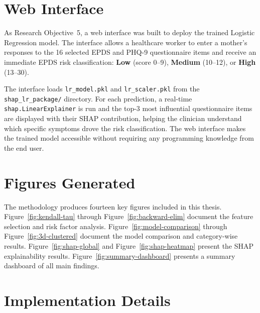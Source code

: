 \section{Web Interface}
\label{ch3-sec-webinterface}

As Research Objective~5, a web interface was built to deploy the trained Logistic Regression model. The interface allows a healthcare worker to enter a mother's responses to the 16 selected EPDS and PHQ-9 questionnaire items and receive an immediate EPDS risk classification: \textbf{Low} (score 0--9), \textbf{Medium} (10--12), or \textbf{High} (13--30).

The interface loads \texttt{lr\_model.pkl} and \texttt{lr\_scaler.pkl} from the \texttt{shap\_lr\_package/} directory. For each prediction, a real-time \texttt{shap.LinearExplainer} is run and the top-3 most influential questionnaire items are displayed with their SHAP contribution, helping the clinician understand which specific symptoms drove the risk classification. The web interface makes the trained model accessible without requiring any programming knowledge from the end user.

\section{Figures Generated}
\label{ch3-sec-figures}

The methodology produces fourteen key figures included in this thesis.
Figure~\ref{fig:kendall-tau} through Figure~\ref{fig:backward-elim} document the feature selection and risk factor analysis.
Figure~\ref{fig:model-comparison} through Figure~\ref{fig:3d-clustered} document the model comparison and category-wise results.
Figure~\ref{fig:shap-global} and Figure~\ref{fig:shap-heatmap} present the SHAP explainability results.
Figure~\ref{fig:summary-dashboard} presents a summary dashboard of all main findings.

\section{Implementation Details}
\label{ch3-sec-implementation}

